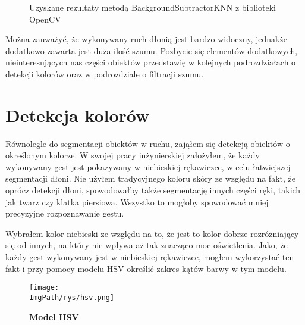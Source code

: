 \documentclass[a4paper,12pt,twoside,openany]{report}
\newcommand{\ImgPath}{.}
\begin{document}
\begin{figure}[H]
	\centering
	\caption{Uzyskane rezultaty metodą BackgroundSubtractorKNN z biblioteki OpenCV}
\end{figure}


Można zauważyć, że wykonywany ruch dłonią jest bardzo widoczny, jednakże dodatkowo zawarta jest duża ilość szumu. Pozbycie się elementów dodatkowych, nieinteresujących nas części obiektów przedstawię w kolejnych podrozdziałach o detekcji kolorów oraz w podrozdziale o filtracji szumu. 

\section{Detekcja kolorów}
Równolegle do segmentacji obiektów w ruchu, zająłem się detekcją obiektów o określonym kolorze. W swojej pracy inżynierskiej założyłem, że każdy wykonywany gest jest pokazywany w niebieskiej rękawiczce, w celu łatwiejszej segmentacji dłoni. Nie użyłem tradycyjnego koloru skóry ze względu na fakt, że oprócz detekcji dłoni, spowodowałby także segmentację innych części ręki, takich jak twarz czy klatka piersiowa. Wszystko to mogłoby spowodować mniej precyzyjne rozpoznawanie gestu.

Wybrałem kolor niebieski ze względu na to, że jest to kolor dobrze rozróżniający się od innych, na który nie wpływa aż tak znacząco moc oświetlenia.
Jako, że każdy gest wykonywany jest w niebieskiej rękawiczce, mogłem wykorzystać ten fakt i przy pomocy modelu HSV określić zakres kątów barwy w tym modelu. 

\begin{figure}[H]	
	\centering
	\texttt{[image: \\ImgPath/rys/hsv.png]}
	
	\caption{  \textbf{Model HSV}}
\end{figure}
\end{document}
